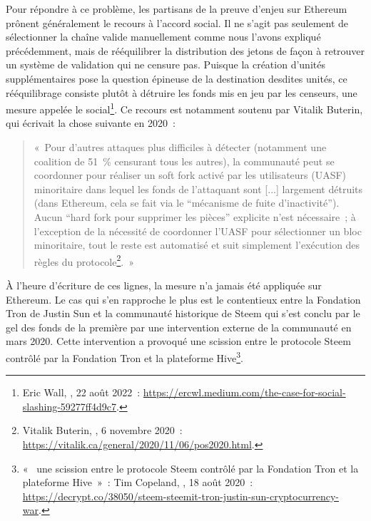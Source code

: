 
Pour répondre à ce problème, les partisans de la preuve d'enjeu sur Ethereum prônent généralement le recours à l'accord social. Il ne s'agit pas seulement de sélectionner la chaîne valide manuellement comme nous l'avons expliqué précédemment, mais de rééquilibrer la distribution des jetons de façon à retrouver un système de validation qui ne censure pas. Puisque la création d'unités supplémentaires pose la question épineuse de la destination desdites unités, ce rééquilibrage consiste plutôt à détruire les fonds mis en jeu par les censeurs, une mesure appelée le  social\footnote{Eric Wall, , 22 août 2022~: \url{https://ercwl.medium.com/the-case-for-social-slashing-59277ff4d9c7}.}. Ce recours est notamment soutenu par Vitalik Buterin, qui écrivait la chose suivante en 2020~:

\begin{quote}
«~Pour d'autres attaques plus difficiles à détecter (notamment une coalition de 51~\% censurant tous les autres), la communauté peut se coordonner pour réaliser un soft fork activé par les utilisateurs (UASF) minoritaire dans lequel les fonds de l'attaquant sont [...] largement détruits (dans Ethereum, cela se fait via le “mécanisme de fuite d'inactivité”). Aucun “hard fork pour supprimer les pièces” explicite n'est nécessaire~; à l'exception de la nécessité de coordonner l'UASF pour sélectionner un bloc minoritaire, tout le reste est automatisé et suit simplement l'exécution des règles du protocole\footnote{Vitalik Buterin, , 6 novembre 2020~: \url{https://vitalik.ca/general/2020/11/06/pos2020.html}.}.~»
\end{quote}


À l'heure d'écriture de ces lignes, la mesure n'a jamais été appliquée sur Ethereum. Le cas qui s'en rapproche le plus est le contentieux entre la Fondation Tron de Justin Sun et la communauté historique de Steem qui s'est conclu par le gel des fonds de la première par une intervention externe de la communauté en mars 2020. Cette intervention a provoqué une scission entre le protocole Steem contrôlé par la Fondation Tron et la plateforme Hive\footnote{«~ une scission entre le protocole Steem contrôlé par la Fondation Tron et la plateforme Hive~»~: Tim Copeland, , 18 août 2020~: \url{https://decrypt.co/38050/steem-steemit-tron-justin-sun-cryptocurrency-war}.}.

